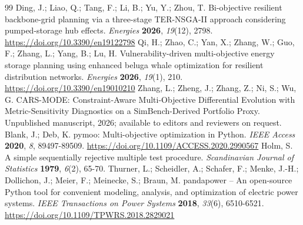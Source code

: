 \documentclass[energies,article,submit,moreauthors]{Definitions/mdpi}
\begin{document}
\begin{thebibliography}{99}
 Ding, J.; Liao, Q.; Tang, F.; Li, B.; Yu, Y.; Zhou, T. Bi-objective resilient backbone-grid planning via a three-stage TER-NSGA-II approach considering pumped-storage hub effects. \emph{Energies} \textbf{2026}, \emph{19}(12), 2798. \url{https://doi.org/10.3390/en19122798}
 Qi, H.; Zhao, C.; Yan, X.; Zhang, W.; Guo, F.; Zhang, L.; Yang, B.; Lu, H. Vulnerability-driven multi-objective energy storage planning using enhanced beluga whale optimization for resilient distribution networks. \emph{Energies} \textbf{2026}, \emph{19}(1), 210. \url{https://doi.org/10.3390/en19010210}
 Zhang, L.; Zheng, J.; Zhang, Z.; Ni, S.; Wu, G. CARS-MODE: Constraint-Aware Multi-Objective Differential Evolution with Metric-Sensitivity Diagnostics on a SimBench-Derived Portfolio Proxy. Unpublished manuscript, 2026; available to editors and reviewers on request.
 Blank, J.; Deb, K. pymoo: Multi-objective optimization in Python. \emph{IEEE Access} \textbf{2020}, \emph{8}, 89497-89509. \url{https://doi.org/10.1109/ACCESS.2020.2990567}
 Holm, S. A simple sequentially rejective multiple test procedure. \emph{Scandinavian Journal of Statistics} \textbf{1979}, \emph{6}(2), 65-70.
 Thurner, L.; Scheidler, A.; Schafer, F.; Menke, J.-H.; Dollichon, J.; Meier, F.; Meinecke, S.; Braun, M. pandapower -- An open-source Python tool for convenient modeling, analysis, and optimization of electric power systems. \emph{IEEE Transactions on Power Systems} \textbf{2018}, \emph{33}(6), 6510-6521. \url{https://doi.org/10.1109/TPWRS.2018.2829021}
\end{thebibliography}
\end{document}
